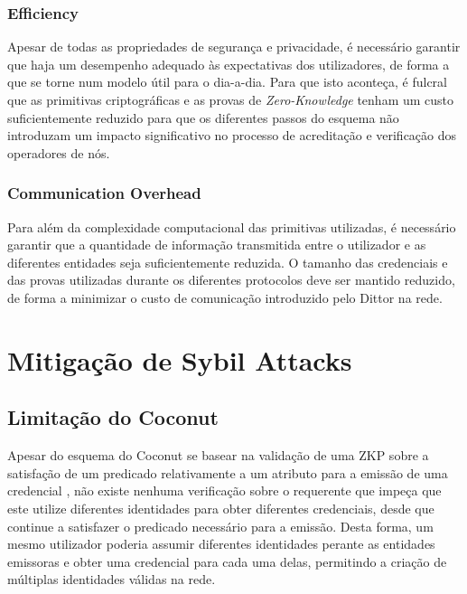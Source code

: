 \subsubsection{Efficiency}

Apesar de todas as propriedades de segurança e privacidade, é necessário garantir que haja um desempenho adequado às expectativas dos utilizadores, de forma a que se torne num modelo útil para o dia-a-dia. Para que isto aconteça, é fulcral que as primitivas criptográficas e as provas de \textit{Zero-Knowledge} tenham um custo suficientemente reduzido para que os diferentes passos do esquema não introduzam um impacto significativo no processo de acreditação e verificação dos operadores de nós.

\subsubsection{Communication Overhead}

Para além da complexidade computacional das primitivas utilizadas, é necessário garantir que a quantidade de informação transmitida entre o utilizador e as diferentes entidades seja suficientemente reduzida. O tamanho das credenciais e das provas utilizadas durante os diferentes protocolos deve ser mantido reduzido, de forma a minimizar o custo de comunicação introduzido pelo Dittor na rede.

\section{Mitigação de Sybil Attacks}
\label{sec:dittor_mitigacao_sybils}

\subsection{Limitação do Coconut}
\label{sub:dittor_limitacao_coconut}

Apesar do esquema do Coconut se basear na validação de uma ZKP sobre a satisfação de um predicado relativamente a um atributo para a emissão de uma credencial \cite{sonnino2018coconut}, não existe nenhuma verificação sobre o requerente que impeça que este utilize diferentes identidades para obter diferentes credenciais, desde que continue a satisfazer o predicado necessário para a emissão. Desta forma, um mesmo utilizador poderia assumir diferentes identidades perante as entidades emissoras e obter uma credencial para cada uma delas, permitindo a criação de múltiplas identidades válidas na rede.


